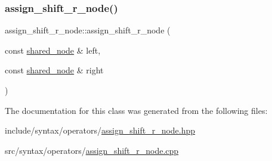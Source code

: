 \subsubsection{\texorpdfstring{assign\+\_\+shift\+\_\+r\+\_\+node()}{assign\_shift\_r\_node()}}
{\footnotesize\ttfamily assign\+\_\+shift\+\_\+r\+\_\+node\+::assign\+\_\+shift\+\_\+r\+\_\+node (\begin{DoxyParamCaption}\item[{const \hyperlink{namespacejawe_a3f307481d921b6cbb50cc8511fc2b544}{shared\+\_\+node} \&}]{left,  }\item[{const \hyperlink{namespacejawe_a3f307481d921b6cbb50cc8511fc2b544}{shared\+\_\+node} \&}]{right }\end{DoxyParamCaption})}



The documentation for this class was generated from the following files\+:\begin{DoxyCompactItemize}
\item 
include/syntax/operators/\hyperlink{assign__shift__r__node_8hpp}{assign\+\_\+shift\+\_\+r\+\_\+node.\+hpp}\item 
src/syntax/operators/\hyperlink{assign__shift__r__node_8cpp}{assign\+\_\+shift\+\_\+r\+\_\+node.\+cpp}\end{DoxyCompactItemize}
